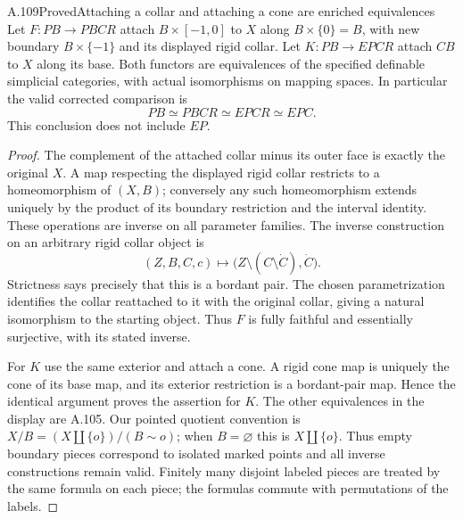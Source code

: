 \begin{saresult}{A.109}{Proved}{Attaching a collar and attaching a cone are enriched equivalences}
Let $F:PB\to PBCR$ attach $B\times[-1,0]$ to $X$ along
$B\times\{0\}=B$, with new boundary $B\times\{-1\}$ and its
displayed rigid collar. Let $K:PB\to EPCR$ attach $CB$ to $X$
along its base. Both functors are equivalences of the specified
definable simplicial categories, with actual isomorphisms on mapping
spaces. In particular the valid corrected comparison is
\[
 PB\simeq PBCR\simeq EPCR\simeq EPC.
\]
This conclusion does not include $EP$.
\end{saresult}
\begin{proof}
The complement of the attached collar minus its outer face is exactly
the original $X$. A map respecting the displayed rigid collar restricts
to a homeomorphism of $(X,B)$; conversely any such homeomorphism extends
uniquely by the product of its boundary restriction and the interval
identity. These operations are inverse on all parameter families.
The inverse construction on an arbitrary rigid collar object is
\[
 (Z,B,C,c)\longmapsto
 \bigl(Z\setminus(C\setminus\dot C),\dot C\bigr).
\]
Strictness says precisely that this is a bordant pair. The chosen
parametrization identifies the collar reattached to it with the
original collar, giving a natural isomorphism to the starting object.
Thus $F$ is fully faithful and essentially surjective, with its stated
inverse.

For $K$ use the same exterior and attach a cone. A rigid cone map is
uniquely the cone of its base map, and its exterior restriction is a
bordant-pair map. Hence the identical argument proves the assertion
for $K$. The other equivalences in the display are A.105. Our pointed
quotient convention is $X/B=(X\amalg\{o\})/(B\sim o)$; when
$B=\varnothing$ this is $X\amalg\{o\}$. Thus empty boundary pieces
correspond to isolated marked points and all inverse constructions
remain valid. Finitely many disjoint labeled pieces are treated by
the same formula on each piece; the formulas commute with permutations
of the labels.
\end{proof}

